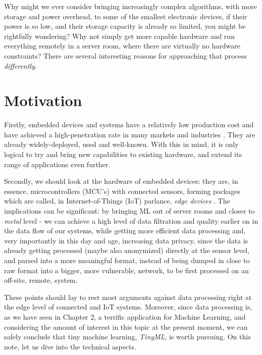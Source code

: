 Why might we ever consider bringing increasingly complex algorithms, with more storage and power overhead, to some of the smallest electronic devices, if their power is so low, and their storage capacity is already so limited, you might be rightfully wondering? Why not simply get more capable hardware and run everything remotely in a server room, where there are virtually no hardware constraints? There are several interesting reasons for approaching that process \textit{differently}.

\section{Motivation}
Firstly, embedded devices and systems have a relatively low production cost and have achieved a high-penetration rate in many markets and industries \cite{statista_embedded_market}. They are already widely-deployed, used and well-known. With this in mind, it is only logical to try and bring new capabilities to existing hardware, and extend its range of applications even further. \cite{tinyml_eetimes} \par
Secondly, we should look at the hardware of embedded devices: they are, in essence, microcontrollers (MCU's) with connected sensors, forming packages which are called, in Internet-of-Things (IoT) parlance, \textit{edge devices} \cite{tinyml_wheeler}. The implications can be significant: by bringing ML out of server rooms and closer to \textit{metal} level - we can achieve a high level of data filtration and quality earlier on in the data flow of our systems, while getting more efficient data processing and, very importantly in this day and age, increasing data privacy, since the data is already getting processed (maybe also anonymized) directly at the sensor level, and parsed into a more meaningful format, instead of being dumped in close to raw format into a bigger, more vulnerable, network, to be first processed on an off-site, remote, system. \cite{edge_privacy} \par
These points should lay to rest most arguments against data processing right at the edge level of connected and IoT systems. Moreover, since data processing is, as we have seen in Chapter 2, a terrific application for Machine Learning, and considering the amount of interest in this topic at the present moment, we can safely conclude that tiny machine learning, \textit{TinyML}, is worth pursuing. On this note, let us dive into the technical aspects.

